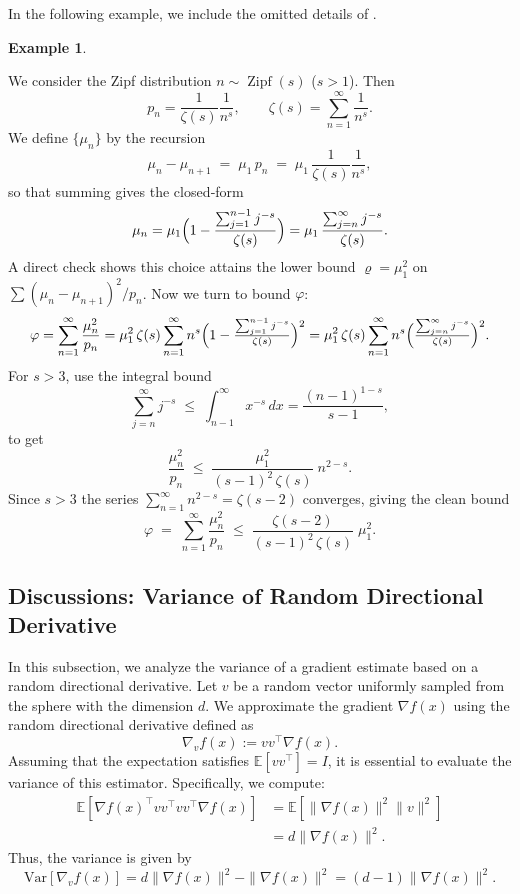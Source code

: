 \documentclass{article}
\theoremstyle{definition}
\newtheorem{example}[definition]{Example}
\theoremstyle{plain}
\theoremstyle{remark}
\begin{document}
In the following example, we include the omitted details of . 
\begin{example} \label{example:zipf-appendix}

We consider the Zipf distribution $n \sim \operatorname{Zipf}(s)$ ($s>1$).  Then
\[
p_n=\frac{1}{\zeta(s)}\frac{1}{n^s}, 
\qquad
\zeta(s)=\sum_{n=1}^\infty \frac{1}{n^s}.
\]
We define $\{\mu_n\}$ by the recursion
\[
\mu_n - \mu_{n+1} \;=\;\mu_1\,p_n
\;=\;\mu_1\,\frac{1}{\zeta(s)}\frac{1}{n^s},
\]
so that summing gives the closed‐form
\[
\mu_n
=\mu_1\Bigl(1-\frac{\sum_{j=1}^{n-1}j^{-s}}{\zeta(s)}\Bigr)
=\mu_1\,\frac{\sum_{j=n}^\infty j^{-s}}{\zeta(s)}.
\]
A direct check shows this choice attains the lower bound $\varrho=\mu_1^2$ on $\sum(\mu_n-\mu_{n+1})^2/p_n$. Now we turn to bound $\varphi$: 
\[
\varphi
=\sum_{n=1}^\infty \frac{\mu_n^2}{p_n}
=\mu_1^2\,\zeta(s)\sum_{n=1}^\infty n^s
\Bigl(1-\tfrac{\sum_{j=1}^{n-1}j^{-s}}{\zeta(s)}\Bigr)^2
=\mu_1^2\,\zeta(s)\sum_{n=1}^\infty n^s
\Bigl(\tfrac{\sum_{j=n}^\infty j^{-s}}{\zeta(s)}\Bigr)^2.
\]
For $s>3$, use the integral bound
\[
\sum_{j=n}^\infty j^{-s}
\;\le\;\int_{n-1}^\infty x^{-s}\,dx
=\frac{(n-1)^{1-s}}{s-1},
\]
to get
\[
\frac{\mu_n^2}{p_n}
\;\le\;\frac{\mu_1^2}{(s-1)^2\,\zeta(s)}\;n^{2-s}.
\]
Since $s>3$ the series $\sum_{n=1}^\infty n^{2-s}=\zeta(s-2)$ converges, giving the clean bound
\[\varphi
\;=\;\sum_{n=1}^\infty\frac{\mu_n^2}{p_n}
\;\le\;\frac{\zeta(s-2)}{(s-1)^2\,\zeta(s)}\;\mu_1^2. 
\] 
\end{example}


\subsection{Discussions: Variance of Random Directional Derivative} 
In this subsection, we analyze the variance of a gradient estimate based on a random directional derivative. Let \( v \) be a random vector uniformly sampled from the sphere with the dimension $d$. We approximate the gradient \( \nabla f(x) \) using the random directional derivative defined as  
\[
\nabla_v f(x) := vv^\top \nabla f(x).
\]  
Assuming that the expectation satisfies \( \mathbb{E}[vv^\top] = I \), it is essential to evaluate the variance of this estimator. Specifically, we compute:  
\begin{align*}
    \mathbb{E} [\nabla f(x)^\top vv^\top   vv^\top \nabla f(x) ] 
    &= \mathbb{E} [\|\nabla f(x) \|^2 \|v\|^2] \\ 
    &= d \|\nabla f(x) \|^2. 
\end{align*}  
Thus, the variance is given by  
\[
\text{Var}[\nabla_v f(x)] = d \|\nabla f(x) \|^2 - \|\nabla f(x) \|^2 = (d-1)\|\nabla f(x) \|^2.
\]  
\end{document}

